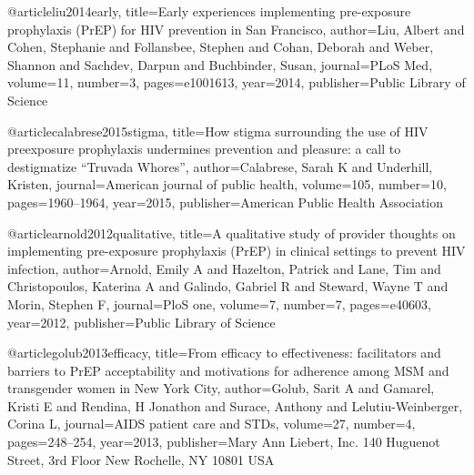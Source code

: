 



@article{liu2014early,
  title={Early experiences implementing pre-exposure prophylaxis (PrEP) for HIV prevention in San Francisco},
  author={Liu, Albert and Cohen, Stephanie and Follansbee, Stephen and Cohan, Deborah and Weber, Shannon and Sachdev, Darpun and Buchbinder, Susan},
  journal={PLoS Med},
  volume={11},
  number={3},
  pages={e1001613},
  year={2014},
  publisher={Public Library of Science}
}

@article{calabrese2015stigma,
  title={How stigma surrounding the use of HIV preexposure prophylaxis undermines prevention and pleasure: a call to destigmatize “Truvada Whores”},
  author={Calabrese, Sarah K and Underhill, Kristen},
  journal={American journal of public health},
  volume={105},
  number={10},
  pages={1960--1964},
  year={2015},
  publisher={American Public Health Association}
}

@article{arnold2012qualitative,
  title={A qualitative study of provider thoughts on implementing pre-exposure prophylaxis (PrEP) in clinical settings to prevent HIV infection},
  author={Arnold, Emily A and Hazelton, Patrick and Lane, Tim and Christopoulos, Katerina A and Galindo, Gabriel R and Steward, Wayne T and Morin, Stephen F},
  journal={PloS one},
  volume={7},
  number={7},
  pages={e40603},
  year={2012},
  publisher={Public Library of Science}
}

@article{golub2013efficacy,
  title={From efficacy to effectiveness: facilitators and barriers to PrEP acceptability and motivations for adherence among MSM and transgender women in New York City},
  author={Golub, Sarit A and Gamarel, Kristi E and Rendina, H Jonathon and Surace, Anthony and Lelutiu-Weinberger, Corina L},
  journal={AIDS patient care and STDs},
  volume={27},
  number={4},
  pages={248--254},
  year={2013},
  publisher={Mary Ann Liebert, Inc. 140 Huguenot Street, 3rd Floor New Rochelle, NY 10801 USA}
}




